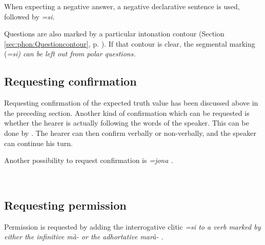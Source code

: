 When expecting a negative answer, a negative declarative sentence is used, followed by \em =si\em.


Questions are also marked by a particular intonation contour (Section \ref{sec:phon:Questioncontour}, p. \pageref{sec:phon:Questioncontour}). If that contour is clear, the segmental marking (\em =si\em) can be left out from polar questions.
 
\subsection{Requesting confirmation}\label{sec:pragm:Requestingconfirmation}
Requesting confirmation of the expected truth value has been discussed above in the preceding section. Another kind of confirmation which can be requested is whether the hearer is actually following the words of the speaker. This can be done by . The hearer can then confirm verbally or non-verbally, and the speaker can continue his turn.


Another possibility to request confirmation is \em =jona \em {}.


\\ 


\subsection{Requesting permission}\label{sec:pragm:Requestingpermission}
Permission is requested by adding the interrogative clitic \em =si \em {} to a verb marked by either the infinitive \em mà- \em {} or the adhortative \em marà- \em {}.


